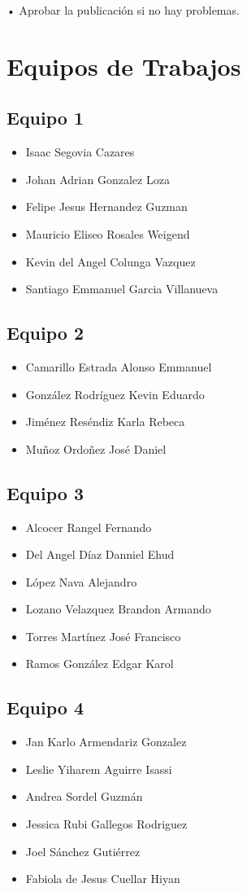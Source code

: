 \documentclass[11pt, a4paper, oneside]{book}
\begin{document}
• Aprobar la publicación si no hay problemas.

\chapter{Equipos de Trabajos}

\section*{Equipo 1}
\begin{itemize}
    \item Isaac Segovia Cazares
    \item Johan Adrian Gonzalez Loza
    \item Felipe Jesus Hernandez Guzman
    \item Mauricio Eliseo Rosales Weigend
    \item Kevin del Angel Colunga Vazquez
    \item Santiago Emmanuel Garcia Villanueva
\end{itemize}

\section*{Equipo 2}
\begin{itemize}
    \item Camarillo Estrada Alonso Emmanuel
    \item González Rodríguez Kevin Eduardo
    \item Jiménez Reséndiz Karla Rebeca
    \item Muñoz Ordoñez José Daniel
\end{itemize}

\section*{Equipo 3}
\begin{itemize}
    \item Alcocer Rangel Fernando
    \item Del Angel Díaz Danniel Ehud
    \item López Nava Alejandro
    \item Lozano Velazquez Brandon Armando
    \item Torres Martínez José Francisco
    \item Ramos González Edgar Karol
\end{itemize}

\section*{Equipo 4}
\begin{itemize}
    \item Jan Karlo Armendariz Gonzalez
    \item Leslie Yiharem Aguirre Isassi
    \item Andrea Sordel Guzmán
    \item Jessica Rubi Gallegos Rodriguez
    \item Joel Sánchez Gutiérrez
    \item Fabiola de Jesus Cuellar Hiyan
\end{itemize}
\end{document}

